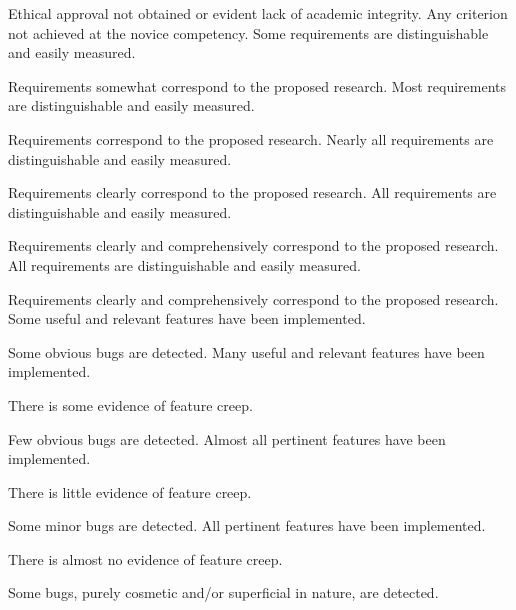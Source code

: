 \documentclass{../fal_assignment}
\begin{document}
\begin{markingrubric}
		\grade\fail Ethical approval not obtained or evident lack of academic integrity.
		\grade\fail Any criterion not achieved at the novice competency.
        \grade \fail 
        \grade Some requirements are distinguishable and easily measured.
            \par Requirements somewhat correspond to the proposed research.
        \grade Most requirements are distinguishable and easily measured.
            \par Requirements correspond to the proposed research.
        \grade Nearly all requirements are distinguishable and easily measured.
            \par Requirements clearly correspond to the proposed research.
        \grade All requirements are distinguishable and easily measured.
            \par Requirements clearly and comprehensively correspond to the proposed research.
        \grade All requirements are distinguishable and easily measured.
            \par Requirements clearly and comprehensively correspond to the proposed research.
%
        \grade \fail 
        \grade Some useful and relevant features have been implemented.
            \par Some obvious bugs are detected.
        \grade Many useful and relevant features have been implemented.
            \par There is some evidence of feature creep.
            \par Few obvious bugs  are detected.
        \grade Almost all pertinent features have been implemented.
            \par There is little evidence of feature creep.
            \par Some minor bugs  are detected.
        \grade All pertinent features have been implemented.
            \par There is almost no evidence of feature creep.
            \par Some bugs, purely cosmetic and/or superficial in nature, are detected.

\end{markingrubric}
\end{document}
